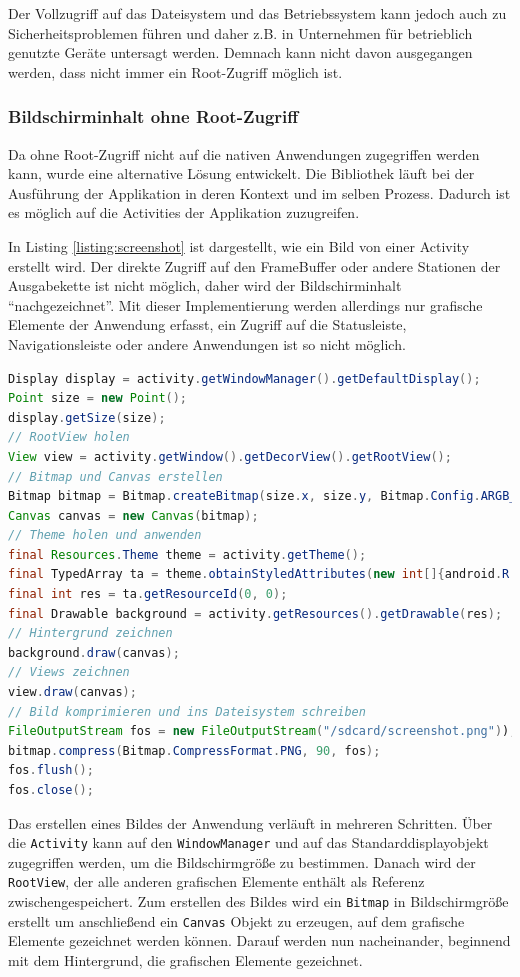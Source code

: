 Der Vollzugriff auf das Dateisystem und das Betriebssystem kann jedoch auch zu Sicherheitsproblemen führen und daher z.B. in Unternehmen für betrieblich genutzte Geräte untersagt werden.
Demnach kann nicht davon ausgegangen werden, dass nicht immer ein Root-Zugriff möglich ist.

\subsubsection{Bildschirminhalt ohne Root-Zugriff}
Da ohne Root-Zugriff nicht auf die nativen Anwendungen zugegriffen werden kann, wurde eine alternative Lösung entwickelt.
Die Bibliothek läuft bei der Ausführung der Applikation in deren Kontext und im selben Prozess.
Dadurch ist es möglich auf die Activities der Applikation zuzugreifen.

In Listing \ref{listing:screenshot} ist dargestellt, wie ein Bild von einer Activity erstellt wird.
Der direkte Zugriff auf den FrameBuffer oder andere Stationen der Ausgabekette ist nicht möglich, daher wird der Bildschirminhalt \enquote{nachgezeichnet}.
Mit dieser Implementierung werden allerdings nur grafische Elemente der Anwendung erfasst, ein Zugriff auf die Statusleiste, Navigationsleiste oder andere Anwendungen ist so nicht möglich.

\begin{lstlisting}[label=listing:screenshot,language=Java, caption=Screenshot Aufnahme ohne Root-Zugriff]
Display display = activity.getWindowManager().getDefaultDisplay();
Point size = new Point();
display.getSize(size);
// RootView holen
View view = activity.getWindow().getDecorView().getRootView();
// Bitmap und Canvas erstellen
Bitmap bitmap = Bitmap.createBitmap(size.x, size.y, Bitmap.Config.ARGB_4444);
Canvas canvas = new Canvas(bitmap);
// Theme holen und anwenden
final Resources.Theme theme = activity.getTheme();
final TypedArray ta = theme.obtainStyledAttributes(new int[]{android.R.attr.windowBackground});
final int res = ta.getResourceId(0, 0);
final Drawable background = activity.getResources().getDrawable(res);
// Hintergrund zeichnen
background.draw(canvas);
// Views zeichnen
view.draw(canvas);
// Bild komprimieren und ins Dateisystem schreiben
FileOutputStream fos = new FileOutputStream("/sdcard/screenshot.png"));
bitmap.compress(Bitmap.CompressFormat.PNG, 90, fos);
fos.flush();
fos.close();
\end{lstlisting}

Das erstellen eines Bildes der Anwendung verläuft in mehreren Schritten.
Über die \texttt{Activity} kann auf den \texttt{WindowManager} und auf das Standarddisplayobjekt zugegriffen werden, um die Bildschirmgröße zu bestimmen.
Danach wird der \texttt{RootView}, der alle anderen grafischen Elemente enthält als Referenz zwischengespeichert.
Zum erstellen des Bildes wird ein \texttt{Bitmap} in Bildschirmgröße erstellt um anschließend ein \texttt{Canvas} Objekt zu erzeugen, auf dem grafische Elemente gezeichnet werden können.
Darauf werden nun nacheinander, beginnend mit dem Hintergrund, die grafischen Elemente gezeichnet.

